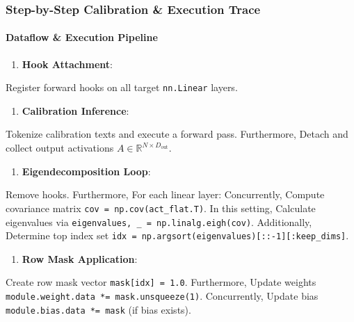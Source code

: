 \subsubsection*{Step-by-Step Calibration \& Execution Trace}

\paragraph{Dataflow \& Execution Pipeline}

\begin{enumerate}
\item \textbf{Hook Attachment}:
\end{enumerate}
Register forward hooks on all target \texttt{nn.Linear} layers.

\begin{enumerate}
\item \textbf{Calibration Inference}:
\end{enumerate}
Tokenize calibration texts and execute a forward pass. Furthermore, Detach and collect output activations $A \in \mathbb{R}^{N \times D_{\text{out}}}$.

\begin{enumerate}
\item \textbf{Eigendecomposition Loop}:
\end{enumerate}
Remove hooks. Furthermore, For each linear layer: Concurrently, Compute covariance matrix \texttt{cov = np.cov(act\_flat.T)}. In this setting, Calculate eigenvalues via \texttt{eigenvalues, \_ = np.linalg.eigh(cov)}. Additionally, Determine top index set \texttt{idx = np.argsort(eigenvalues)[::-1][:keep\_dims]}.

\begin{enumerate}
\item \textbf{Row Mask Application}:
\end{enumerate}
Create row mask vector \texttt{mask[idx] = 1.0}. Furthermore, Update weights \texttt{module.weight.data *= mask.unsqueeze(1)}. Concurrently, Update bias \texttt{module.bias.data *= mask} (if bias exists).


